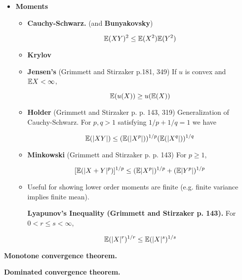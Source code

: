 \begin{itemize}
\item \textbf{Moments}

\begin{itemize}

\item \begin{theorem} \textbf{Cauchy-Schwarz.} (and \textbf{Bunyakovsky})

\[
\mathbb{E}(XY)^2 \leq \mathbb{E}(X^2) \mathbb{E}(Y^2)
\]
\end{theorem}

\item \textbf{Krylov}

\item \begin{theorem} \textbf{Jensen's} (Grimmett and Stirzaker p.181, 349) If \(u\) is convex and \(\mathbb{E} X < \infty\), 

\[
\mathbb{E}(u(X)) \geq u(\mathbb{E}(X))
\]
\end{theorem}

\item \begin{theorem} \textbf{Holder} (Grimmett and Stirzaker p. p. 143, 319) Generalization of Cauchy-Schwarz. For \(p, q > 1\) satisfying \(1/p + 1/q =1\) we have

\[
\mathbb{E}(|XY|) \leq (\mathbb{E}(|X^p|))^{1/p}(\mathbb{E}(|X^q|))^{1/q} 
\]
\end{theorem}

\item \begin{theorem} \textbf{Minkowski} (Grimmett and Stirzaker p. p. 143) For \(p \geq 1\),

\[
[\mathbb{E}(|X + Y|^p)]^{1/p} \leq (\mathbb{E}|X^p|)^{1/p} + (\mathbb{E}|Y^p|)^{1/p}
\]
\end{theorem}

\item Useful for showing lower order moments are finite (e.g. finite variance implies finite mean). \begin{lemma}\textbf{Lyapunov's Inequality (Grimmett and Stirzaker p. 143).}\label{asym.lyapunov} For \(0 < r \leq s < \infty\),

\[
\mathbb{E}(|X|^r)^{1/r} \leq \mathbb{E}(|X|^s)^{1/s} 
\]
\end{lemma}
\end{itemize}

\end{itemize}

\textbf{Monotone convergence theorem.}

\textbf{Dominated convergence theorem.}

